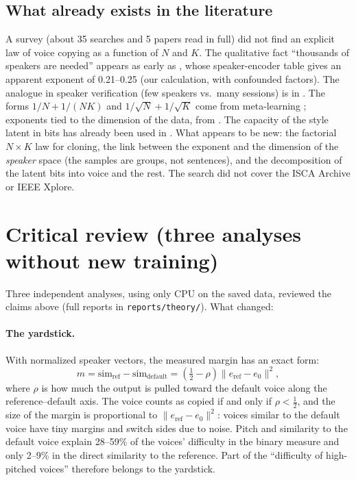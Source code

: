 \documentclass[a4paper,11pt]{article}
\begin{document}
\subsection{What already exists in the literature}
A survey (about 35 searches and 5 papers read in full) did not find an explicit law of voice copying as a function of $N$ and $K$. The qualitative fact ``thousands of speakers are needed'' appears as early as \cite{jia2018}, whose speaker-encoder table gives an apparent exponent of 0.21--0.25 (our calculation, with confounded factors). The analogue in speaker verification (few speakers vs.\ many sessions) is in \cite{tinyvox}. The forms $1/N + 1/(NK)$ and $1/\sqrt N + 1/\sqrt K$ come from meta-learning \cite{du2021,maurer2016}; exponents tied to the dimension of the data, from \cite{sharma2020,bahri2021}. The capacity of the style latent in bits has already been used in \cite{capacitron}. What appears to be new: the factorial $N\times K$ law for cloning, the link between the exponent and the dimension of the \emph{speaker} space (the samples are groups, not sentences), and the decomposition of the latent bits into voice and the rest. The search did not cover the ISCA Archive or IEEE Xplore.

\section{Critical review (three analyses without new training)}
\label{sec:revisao}

Three independent analyses, using only CPU on the saved data, reviewed the claims above (full reports in \texttt{reports/theory/}). What changed:

\paragraph{The yardstick.} With normalized speaker vectors, the measured margin has an exact form:
\[
m = \mathrm{sim}_{\text{ref}} - \mathrm{sim}_{\text{default}} = \left(\tfrac12 - \rho\right)\lVert e_{\text{ref}} - e_0\rVert^2,
\]
where $\rho$ is how much the output is pulled toward the default voice along the reference--default axis. The voice counts as copied if and only if $\rho<\tfrac12$, and the size of the margin is proportional to $\lVert e_{\text{ref}}-e_0\rVert^2$: voices similar to the default voice have tiny margins and switch sides due to noise. Pitch and similarity to the default voice explain 28--59\% of the voices' difficulty in the binary measure and only 2--9\% in the direct similarity to the reference. Part of the ``difficulty of high-pitched voices'' therefore belongs to the yardstick.
\end{document}
